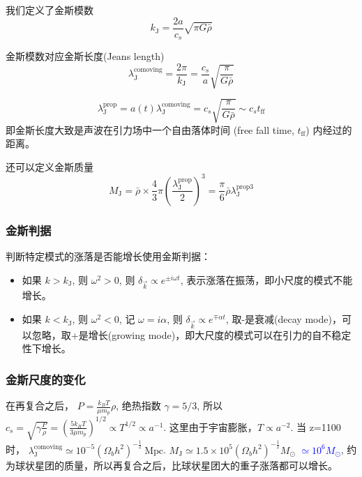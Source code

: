 \documentclass[12pt]{ctexart}
\newcommand{\new}[1]{\textcolor{blue}{#1}}
\begin{document}
我们定义了金斯模数
\begin{equation}
    k_\text{J} = \frac{2a}{c_s} \sqrt{\pi G \bar{\rho}}
\end{equation}

金斯模数对应金斯长度(Jeans length)
\begin{equation}
    \lambda_\text{J}^\text{comoving} = \frac{2\pi }{k_\text{J}} = \frac{c_s}{a} \sqrt{\frac{\pi}{G \bar{\rho}} }
\end{equation}

\begin{equation}
    \lambda_\text{J}^\text{prop} = a(t)\lambda_\text{J}^\text{comoving} = c_s\sqrt{\frac{\pi}{G\bar{\rho}}} \sim c_s t_\text{ff}
\end{equation}
即金斯长度大致是声波在引力场中一个自由落体时间 (free fall time, $t_\text{ff}$) 内经过的距离。

还可以定义金斯质量
\begin{equation}
    M_\text{J} = \bar{\rho} \times \frac{4}{3} \pi \left(\frac{\lambda_\text{J}^\text{prop}}{2}\right)^3  = \frac{\pi}{6}\bar{\rho} \lambda_\text{J}^{\text{prop} 3}
\end{equation}

\subsubsection{金斯判据}
判断特定模式的涨落是否能增长使用金斯判据：
\begin{itemize}
    \item 如果 $k>k_\text{J}$, 则 $\omega^2>0$, 则 $\delta_{\vec{k}}\propto e^{\pm i\omega t}$, 表示涨落在振荡，即小尺度的模式不能增长。
    \item 如果 $k<k_\text{J}$, 则 $\omega^2<0$, 记 $\omega=i\alpha$, 则 $\delta_{\vec{k}}\propto e^{\mp \alpha t}$, 取-是衰减(decay mode)，可以忽略，取+是增长(growing mode)，即大尺度的模式可以在引力的自不稳定性下增长。
\end{itemize}

\subsubsection{金斯尺度的变化}
在再复合之后，
$P=\frac{k_{B}T}{\mu m_p}\rho$,
绝热指数 $\gamma =5/3$, 
所以 $c_s=\sqrt{\gamma \frac{P}{\rho}} =\left(\frac{5k_B T}{3\mu m_p}\right)^{1/2} \propto T^{1/2} \propto a^{-1}$. 这里由于宇宙膨胀，$T\propto a^{-2}$.
当 z=1100 时，
$\lambda_\text{J}^\text{comoving} \simeq 10^{-5}  \left(\Omega_b h^2\right)^{-\frac{1}{2}} \mathrm{~Mpc}$.
$M_\text{J} \simeq 1.5\times 10^5 \left(\Omega_b h^2\right)^{-\frac{1}{2}} M_\odot$ \new{$\simeq 10^6 M_\odot$}, 约为球状星团的质量，所以再复合之后，比球状星团大的重子涨落都可以增长。
\end{document}
